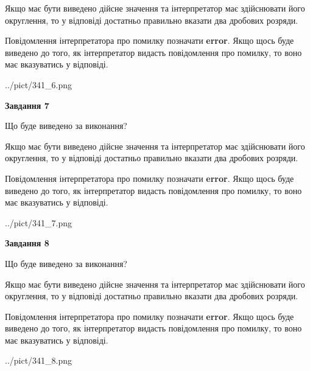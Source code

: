 \documentclass[12pt, ukrainian]{article}
\begin{document}
{\begin {Large}
Якщо має бути виведено дійсне значення та інтерпретатор має здійснювати його округлення, 
то у відповіді достатньо правильно вказати два дробових розряди.

Повідомлення інтерпретатора про помилку позначати \textbf{error}.
Якщо щось буде виведено до того, як інтерпретатор видасть повідомлення про помилку, 
то воно має вказуватись у відповіді. \par

\begin{center}
	{../pict/341_6.png}
\end{center}
\newpage

{\begin {center}\textbf{Завдання 7}\end {center}}\par
Що буде виведено за виконання? \par

Якщо має бути виведено дійсне значення та інтерпретатор має здійснювати його округлення, 
то у відповіді достатньо правильно вказати два дробових розряди.

Повідомлення інтерпретатора про помилку позначати \textbf{error}.
Якщо щось буде виведено до того, як інтерпретатор видасть повідомлення про помилку, 
то воно має вказуватись у відповіді. \par

\begin{center}
	{../pict/341_7.png}
\end{center}
\newpage

{\begin {center}\textbf{Завдання 8}\end {center}}\par
Що буде виведено за виконання? \par

Якщо має бути виведено дійсне значення та інтерпретатор має здійснювати його округлення, 
то у відповіді достатньо правильно вказати два дробових розряди.

Повідомлення інтерпретатора про помилку позначати \textbf{error}.
Якщо щось буде виведено до того, як інтерпретатор видасть повідомлення про помилку, 
то воно має вказуватись у відповіді. \par

\begin{center}
	{../pict/341_8.png}
\end{center}
\newpage


\end{Large}}
\end{document}
